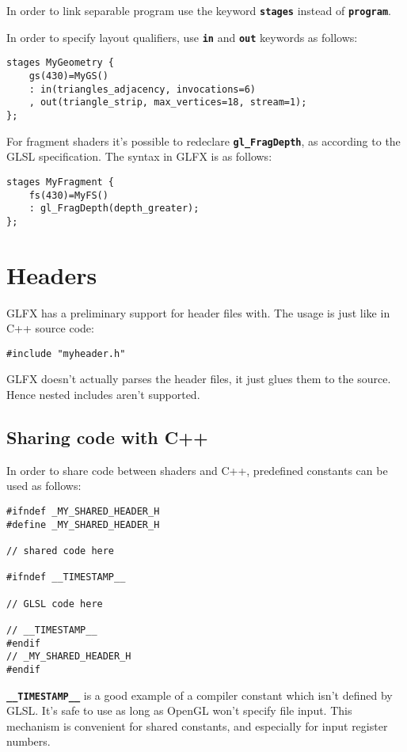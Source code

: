 \documentclass[11pt,a4paper,final,titlepage]{article}
\begin{document}
In order to link separable program use the keyword \texttt{\textbf{stages}} instead of
\texttt{\textbf{program}}.

In order to specify layout qualifiers, use \texttt{\textbf{in}} and \texttt{\textbf{out}} keywords
as follows:
\begin{lstlisting}
stages MyGeometry {
	gs(430)=MyGS()
	: in(triangles_adjacency, invocations=6)
	, out(triangle_strip, max_vertices=18, stream=1);
};
\end{lstlisting}

For fragment shaders it's possible to redeclare \texttt{\textbf{gl\_FragDepth}}, as according to the
GLSL specification. The syntax in GLFX is as follows:
\begin{lstlisting}
stages MyFragment {
	fs(430)=MyFS()
	: gl_FragDepth(depth_greater);
};
\end{lstlisting}

\pagebreak
\section{Headers}
GLFX has a preliminary support for header files with. The usage is just like in C++ source
code:
\begin{lstlisting}
#include "myheader.h"
\end{lstlisting}

GLFX doesn't actually parses the header files, it just glues them to the source. Hence nested
includes aren't supported.

\subsection{Sharing code with C++}
In order to share code between shaders and C++, predefined constants can be used as follows:
\begin{lstlisting}
#ifndef _MY_SHARED_HEADER_H
#define _MY_SHARED_HEADER_H

// shared code here

#ifndef __TIMESTAMP__

// GLSL code here

// __TIMESTAMP__
#endif
// _MY_SHARED_HEADER_H
#endif
\end{lstlisting}

\texttt{\textbf{\_\_TIMESTAMP\_\_}} is a good example of a compiler constant which isn't defined by GLSL.
It's safe to use as long as OpenGL won't specify file input.
This mechanism is convenient for shared constants, and especially for input register numbers.
\end{document}

